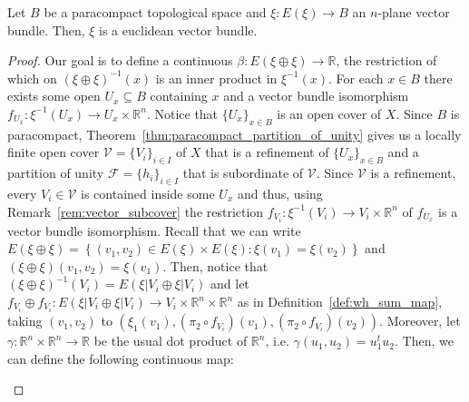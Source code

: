 \begin{proposition} Let $B$ be a paracompact topological space and $\xi:E(\xi)\to B$ an $n$-plane vector bundle. Then, $\xi$ is a euclidean vector bundle.
\end{proposition}
\begin{proof} Our goal is to define a continuous $\beta:E(\xi\oplus\xi)\to\mathbb{R}$, the restriction of which on $(\xi\oplus\xi)^{-1}(x)$ is an inner product in $\xi^{-1}(x)$. For each $x\in B$ there exists some open $U_x\subseteq B$ containing $x$ and a vector bundle isomorphism $f_{U_x}:\xi^{-1}(U_x)\to U_x\times\mathbb{R}^n$. Notice that $\{U_x\}_{x\in B}$ is an open cover of $X$. Since $B$ is paracompact, Theorem~\ref{thm:paracompact_partition_of_unity} gives us a locally finite open cover $\mathcal{V}=\{V_i\}_{i\in I}$ of $X$ that is a refinement of $\{U_x\}_{x\in B}$ and a partition of unity $\mathcal{F}=\{h_i\}_{i\in I}$ that is subordinate of $\mathcal{V}$. Since $\mathcal{V}$ is a refinement, every $V_i\in\mathcal{V}$ is contained inside some $U_x$ and thus, using Remark~\ref{rem:vector_subcover} the restriction $f_{V_i}:\xi^{-1}(V_i)\to V_i\times\mathbb{R}^n$ of $f_{U_x}$ is a vector bundle isomorphism. Recall that we can write $E(\xi\oplus\xi)=\left\{(v_1,v_2)\in E(\xi)\times E(\xi):\xi(v_1)=\xi(v_2)\right\}$ and $(\xi\oplus\xi)(v_1,v_2)=\xi(v_1)$. Then, notice that $(\xi\oplus\xi)^{-1}(V_i)=E(\xi|V_i\oplus\xi|V_i)$ and let $f_{V_i}\oplus f_{V_i}:E(\xi|V_i\oplus\xi|V_i)\to V_i\times\mathbb{R}^n\times\mathbb{R}^n$ as in Definition~\ref{def:wh_sum_map}, taking $(v_1,v_2)$ to $(\xi_1(v_1),(\pi_2\circ f_{V_i})(v_1),(\pi_2\circ f_{V_i})(v_2))$. Moreover, let $\gamma:\mathbb{R}^n\times\mathbb{R}^n\to\mathbb{R}$ be the usual dot product of $\mathbb{R}^n$, i.e. $\gamma(u_1,u_2)=u_1^tu_2$. Then, we can define the following continuous map:
\begin{center}
\end{center}

\end{proof}
